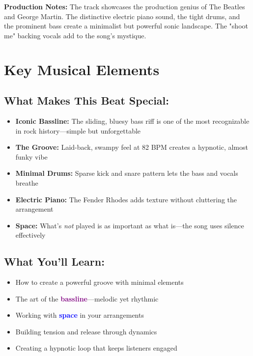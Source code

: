\documentclass[11pt,letterpaper]{article}
\newcommand{\purple}[1]{\textcolor{purple}{\textbf{#1}}}
\newcommand{\bluepurple}[1]{\textcolor{blue}{\textbf{#1}}}
\begin{document}
\textbf{Production Notes:} The track showcases the production genius of The Beatles and George Martin. The distinctive electric piano sound, the tight drums, and the prominent bass create a minimalist but powerful sonic landscape. The "shoot me" backing vocals add to the song's mystique.

\vspace{0.5cm}

\section*{Key Musical Elements}

\subsection*{What Makes This Beat Special:}

\begin{itemize}[leftmargin=*]
\item \textbf{Iconic Bassline:} The sliding, bluesy bass riff is one of the most recognizable in rock history—simple but unforgettable
\item \textbf{The Groove:} Laid-back, swampy feel at 82 BPM creates a hypnotic, almost funky vibe
\item \textbf{Minimal Drums:} Sparse kick and snare pattern lets the bass and vocals breathe
\item \textbf{Electric Piano:} The Fender Rhodes adds texture without cluttering the arrangement
\item \textbf{Space:} What's \textit{not} played is as important as what is—the song uses silence effectively
\end{itemize}

\subsection*{What You'll Learn:}

\begin{itemize}[leftmargin=*]
\item How to create a powerful groove with minimal elements
\item The art of the \purple{bassline}—melodic yet rhythmic
\item Working with \bluepurple{space} in your arrangements
\item Building tension and release through dynamics
\item Creating a hypnotic loop that keeps listeners engaged
\end{itemize}
\end{document}
